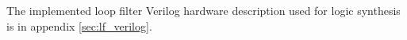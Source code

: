 	 The implemented loop filter Verilog hardware description used for logic synthesis is in appendix \ref{sec:lf_verilog}.













